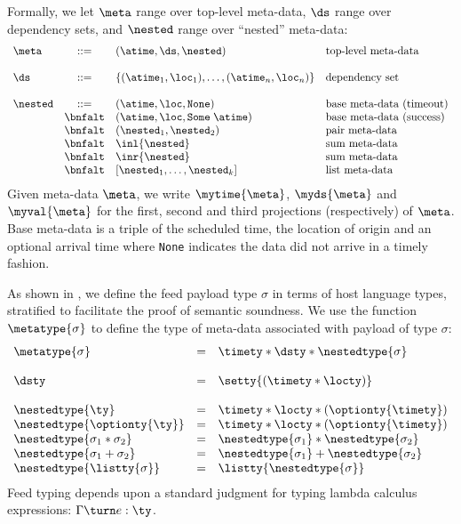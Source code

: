 Formally, we let 
$\meta$ range over top-level meta-data,
$\ds$ range over dependency sets, and 
$\nested$ range over ``nested'' meta-data:
\[
\begin{array}{lcll} 
\meta & ::= & (\atime,\ds,\nested) & \mbox{top-level meta-data} \\  
\\
\ds   & ::= & \{(\atime_1,\loc_1),\ldots,(\atime_n, \loc_n) \}  & \mbox{dependency set}\\ 
\\
\nested & ::=     
          & (\atime,\loc,\mathtt{None}) & \mbox{base meta-data (timeout)} \\
& \bnfalt & (\atime,\loc,\mathtt{Some}\; \atime) & \mbox{base meta-data (success)} \\
& \bnfalt & (\nested_1,\nested_2) & \mbox{pair meta-data} \\
& \bnfalt & \inl{\nested} & \mbox{sum meta-data} \\
& \bnfalt & \inr{\nested} & \mbox{sum meta-data} \\
& \bnfalt & [\nested_1,\ldots,\nested_k] & \mbox{list meta-data} \\
\end{array}
\] 
Given meta-data $\meta$, we write $\mytime{\meta}$, $\myds{\meta}$ and
$\myval{\meta}$ for the first, second and third projections (respectively) of $\meta$.
Base meta-data is a triple of the scheduled time, the location of origin 
and an optional arrival time where {\tt None} indicates the data did not arrive
in a timely fashion.



As shown in , we define the feed payload type
$\sigma$ in terms of host 
language types, stratified to facilitate the proof of
semantic soundness.  
We use the function $\metatype{\sigma}$ to define the type of
meta-data associated with payload of type $\sigma$:
\[
\begin {array} {lcl}
\metatype{\sigma} & = & \timety * \dsty * \nestedtype{\sigma} \\
\\
\dsty & = & \setty{(\timety * \locty)}  \\
\\
\nestedtype{\ty} & = & \timety * \locty * (\optionty{\timety}) \\
\nestedtype{\optionty{\ty}} & = & \timety * \locty * (\optionty{\timety}) \\
\nestedtype{\sigma_1 * \sigma_2} & = & \nestedtype{\sigma_1} * \nestedtype{\sigma_2} \\
\nestedtype{\sigma_1 + \sigma_2} & = & \nestedtype{\sigma_1} + \nestedtype{\sigma_2} \\
\nestedtype{\listty{\sigma}} & = & \listty{\nestedtype{\sigma}} \\
\end{array}
\]
Feed typing depends upon a standard judgment for
typing lambda calculus expressions: $\Gamma \turn e : \ty$.  


